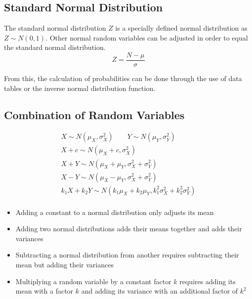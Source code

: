 \documentclass[../main]{subfiles}
\begin{document}
	\subsection{Standard Normal Distribution}

	The standard normal distribution \(Z\) is a specially defined normal distribution as \(Z \sim N(0,1)\). Other normal random variables can be adjusted in order to equal the standard normal distribution. \\

	\[ Z = \frac{N-\mu}{\sigma} \]

	From this, the calculation of probabilities can be done through the use of data tables or the inverse normal distribution function. \\

	\subsection{Combination of Random Variables}

	\begin{equation*} \begin{gathered}
		X \sim N(\mu_X,\sigma_X^2) \qquad Y \sim N(\mu_Y,\sigma_Y^2) \\
		X + c \sim N(\mu_X + c,\sigma_X^2) \\
		X + Y \sim N(\mu_X + \mu_Y,\sigma_X^2 + \sigma_Y^2) \\
		X - Y \sim N(\mu_X - \mu_Y,\sigma_X^2 + \sigma_Y^2) \\
		k_1 X + k_2 Y \sim N(k_1 \mu_X + k_2 \mu_Y,k_1^2 \sigma_X^2 + k_2^2 \sigma_Y^2) \\
	\end{gathered} \end{equation*}

	\begin{itemize}
		\item Adding a constant to a normal distribution only adjusts its mean
		\item Adding two normal distributions adds their means together and adds their variances
		\item Subtracting a normal distribution from another requires subtracting their mean but adding their variances
		\item Multiplying a random variable by a constant factor \(k\) requires adding its mean with a factor \(k\) and adding its variance with an additional factor of \(k^2\)
	\end{itemize}
\end{document}
